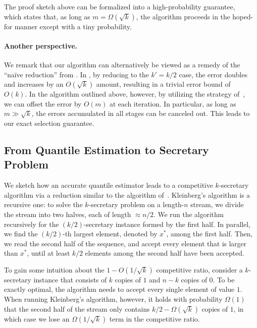 The proof sketch above can be formalized into a high-probability guarantee, which states that, as long as $m = \Omega(\sqrt{k})$, the algorithm proceeds in the hoped-for manner except with a tiny probability.

\paragraph{Another perspective.} We remark that our algorithm can alternatively be viewed as a remedy of the ``na\"ive reduction'' from . In , by reducing to the $k' = k/2$ case, the error doubles and increases by an $O(\sqrt{k})$ amount, resulting in a trivial error bound of $O(k)$. In the algorithm outlined above, however, by utilizing the strategy of~\cite{MP80}, we can offset the error by $O(m)$ at each iteration. In particular, as long as $m \gg \sqrt{k}$, the errors accumulated in all stages can be canceled out. This leads to our exact selection guarantee.

\subsection{From Quantile Estimation to Secretary Problem}\label{sec:overview-reduction}
We sketch how an accurate quantile estimator leads to a competitive $k$-secretary algorithm via a reduction similar to the algorithm of~\cite{Kleinberg05}. Kleinberg's algorithm is a recursive one: to solve the $k$-secretary problem on a length-$n$ stream, we divide the stream into two halves, each of length $\approx n/2$. We run the algorithm recursively for the $(k/2)$-secretary instance formed by the first half. In parallel, we find the $(k/2)$-th largest element, denoted by $x^*$, among the first half. Then, we read the second half of the sequence, and accept every element that is larger than $x^*$, until at least $k/2$ elements among the second half have been accepted.

To gain some intuition about the $1 - O(1/\sqrt{k})$ competitive ratio, consider a $k$-secretary instance that consists of $k$ copies of $1$ and $n - k$ copies of $0$. To be exactly optimal, the algorithm needs to accept every single element of value $1$. When running Kleinberg's algorithm, however, it holds with probability $\Omega(1)$ that the second half of the stream only contains $k/2 - \Omega(\sqrt{k})$ copies of $1$, in which case we lose an $\Omega(1/\sqrt{k})$ term in the competitive ratio.

